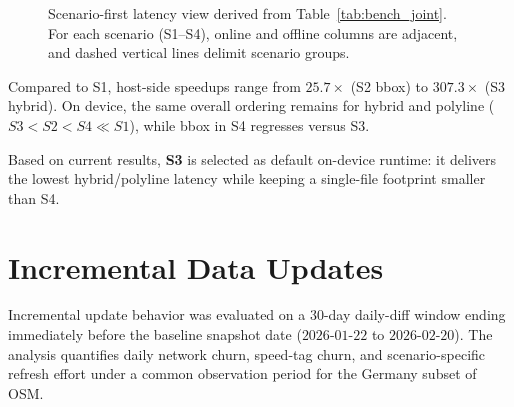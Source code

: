 \documentclass{article}
\begin{document}
\begin{figure}[!htbp]
\centering
{}
\caption{Scenario-first latency view derived from Table~\ref{tab:bench_joint}. For each scenario (S1--S4), online and offline columns are adjacent, and dashed vertical lines delimit scenario groups.}
\label{fig:bench_boxplot}
\end{figure}

Compared to S1, host-side speedups range from \(25.7\times\) (S2 bbox) to \(307.3\times\) (S3 hybrid). On device, the same overall ordering remains for hybrid and polyline (\(S3 < S2 < S4 \ll S1\)), while bbox in S4 regresses versus S3.

Based on current results, \textbf{S3} is selected as default on-device runtime: it delivers the lowest hybrid/polyline latency while keeping a single-file footprint smaller than S4.

\section{Incremental Data Updates}
Incremental update behavior was evaluated on a 30-day daily-diff window ending immediately before the baseline snapshot date (\(2026\)-\(01\)-\(22\) to \(2026\)-\(02\)-\(20\)). The analysis quantifies daily network churn, speed-tag churn, and scenario-specific refresh effort under a common observation period for the Germany subset of OSM.
\end{document}
